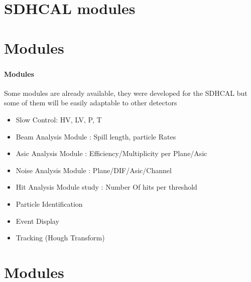 \documentclass[8pt]{beamer}
\begin{document}
  \section{SDHCAL modules}

    \section{Modules}

  \begin{frame}
  \frametitle{\secname}
  \framesubtitle{Modules}

  Some modules are already available, they were developed for the SDHCAL but some of them will be easily adaptable to other detectors
    \begin{itemize}
      \item Slow Control: HV, LV, P, T
      \item Beam Analysis Module : Spill length, particle Rates
      \item Asic Analysis Module : Efficiency/Multiplicity per Plane/Asic
      \item Noise Analysis Module : Plane/DIF/Asic/Channel
      \item Hit Analysis Module study : Number Of hits per threshold
      \item Particle Identification
      \item Event Display
      \item Tracking (Hough Transform)
    \end{itemize}

  \end{frame}

 \section{Modules}
\end{document}
